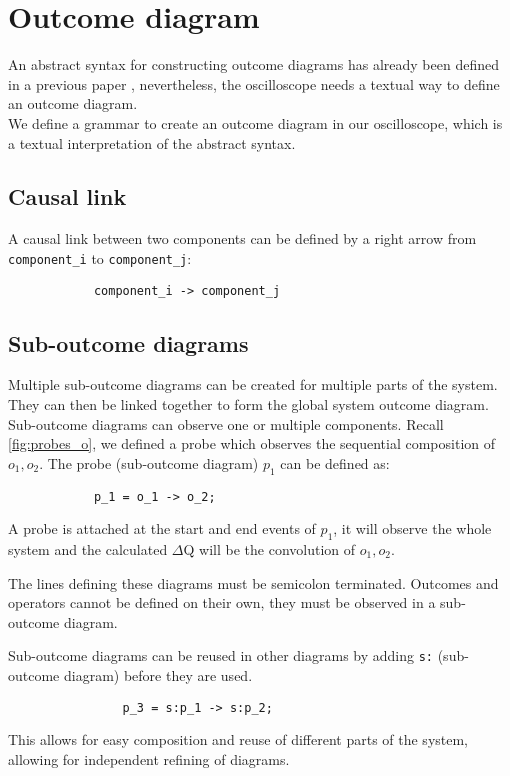 \section{Outcome diagram} \label{out_syntax}
        An abstract syntax for constructing outcome diagrams has already been defined in a previous paper \cite{art}, nevertheless, the oscilloscope needs a textual way to define an outcome diagram. \\ 
        We define  a grammar to create an outcome diagram in our oscilloscope, which is a textual interpretation of the abstract syntax.
        
      
        \subsection{Causal link}
            A causal link between two components can be defined by a right arrow from \texttt{component\_i} to \texttt{component\_j}:
        \begin{verbatim}
            component_i -> component_j 
        \end{verbatim}
        
        \subsection{Sub-outcome diagrams}
            Multiple sub-outcome diagrams can be created for multiple parts of the system. They can then be linked together to form the global system outcome diagram. Sub-outcome diagrams can observe one or multiple components.
        Recall \cref{fig:probes_o}, we defined a probe which observes the sequential composition of $o_1, o_2$. The probe (sub-outcome diagram) $p_1$ can be defined as:
        \begin{verbatim}
            p_1 = o_1 -> o_2;
        \end{verbatim}

        A probe is attached at the start and end events of $p_1$, it will observe the whole system and the calculated $\Delta$Q will be the convolution of $o_1, o_2$.

        The lines defining these diagrams must be semicolon terminated. Outcomes and operators cannot be defined on their own, they must be observed in a sub-outcome diagram.
        
        Sub-outcome diagrams can be reused in other diagrams by adding \texttt{s:} (sub-outcome diagram) before they are used.

            \begin{verbatim}
                p_3 = s:p_1 -> s:p_2;
            \end{verbatim}
            This allows for easy composition and reuse of different parts of the system, allowing for independent refining of diagrams.

